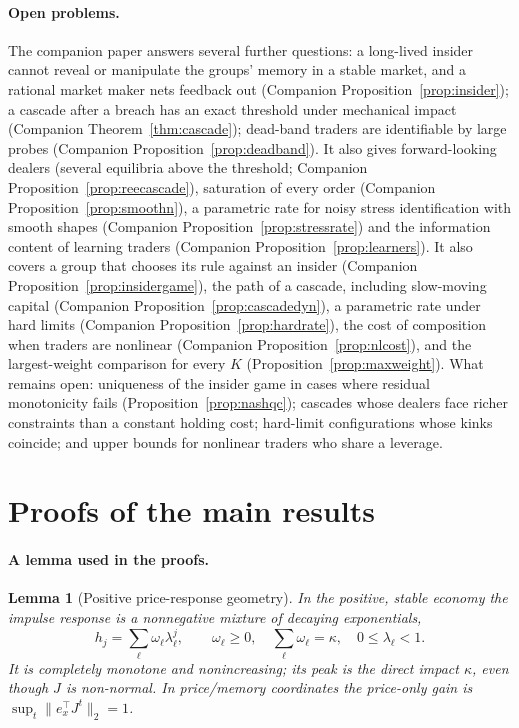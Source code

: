 \documentclass[12pt]{article}
\newtheorem{lemma}[theorem]{Lemma}
\theoremstyle{definition}
\theoremstyle{remark}
\begin{document}
\paragraph{Open problems.} The companion paper \citep{niroula2026c} answers several further questions: a long-lived insider cannot reveal or manipulate the groups' memory in a stable market, and a rational market maker nets feedback out (Companion Proposition~\ref{prop:insider}); a cascade after a breach has an exact threshold under mechanical impact (Companion Theorem~\ref{thm:cascade}); dead-band traders are identifiable by large probes (Companion Proposition~\ref{prop:deadband}). It also gives forward-looking dealers (several equilibria above the threshold; Companion Proposition~\ref{prop:reecascade}), saturation of every order (Companion Proposition~\ref{prop:smoothn}), a parametric rate for noisy stress identification with smooth shapes (Companion Proposition~\ref{prop:stressrate}) and the information content of learning traders (Companion Proposition~\ref{prop:learners}). It also covers a group that chooses its rule against an insider (Companion Proposition~\ref{prop:insidergame}), the path of a cascade, including slow-moving capital (Companion Proposition~\ref{prop:cascadedyn}), a parametric rate under hard limits (Companion Proposition~\ref{prop:hardrate}), the cost of composition when traders are nonlinear (Companion Proposition~\ref{prop:nlcost}), and the largest-weight comparison for every $K$ (Proposition~\ref{prop:maxweight}). What remains open: uniqueness of the insider game in cases where residual monotonicity fails (Proposition~\ref{prop:nashqc}); cascades whose dealers face richer constraints than a constant holding cost; hard-limit configurations whose kinks coincide; and upper bounds for nonlinear traders who share a leverage.



\section{Proofs of the main results}\label{app:proofs}

\paragraph{A lemma used in the proofs.}
\begin{lemma}[Positive price-response geometry]\label{lem:cm}
In the positive, stable economy the impulse response is a nonnegative mixture of decaying exponentials,
\[
h_j=\sum_\ell \omega_\ell\lambda_\ell^j,\qquad \omega_\ell\ge0,\quad \sum_\ell\omega_\ell=\kappa,\quad 0\le\lambda_\ell<1 .
\]
It is completely monotone and nonincreasing; its peak is the direct impact $\kappa$, even though $J$ is non-normal. In price/memory coordinates the price-only gain is $\sup_t\|e_x^\top J^t\|_2=1$.
\end{lemma}
\end{document}
